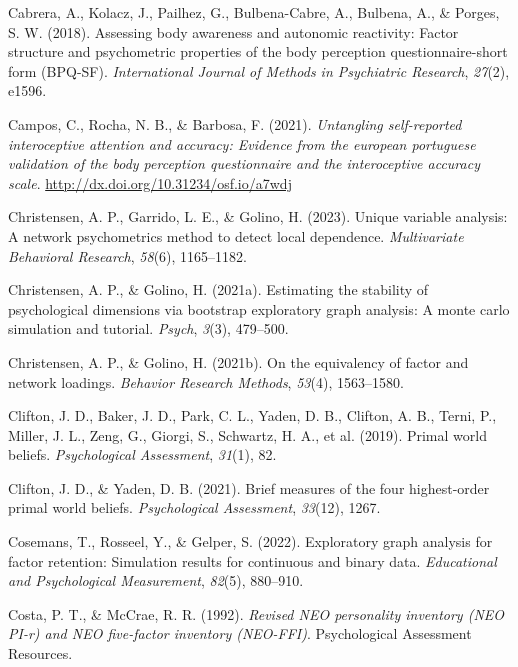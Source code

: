 \documentclass[
  jou,
  floatsintext,
  longtable,
  nolmodern,
  notxfonts,
  notimes,
  colorlinks=true,linkcolor=blue,citecolor=blue,urlcolor=blue]{apa7}
\newlength{\cslhangindent}
\newenvironment{CSLReferences}[2] %
 {\begin{list}{}{%
  \setlength{\itemindent}{0pt}
  \setlength{\leftmargin}{0pt}
  \setlength{\parsep}{0pt}
  \ifodd #1
   \setlength{\leftmargin}{\cslhangindent}
   \setlength{\itemindent}{-1\cslhangindent}
  \fi
  \setlength{\itemsep}{#2\baselineskip}}}
 {\end{list}}
\begin{document}
\begin{CSLReferences}{1}{0}
Cabrera, A., Kolacz, J., Pailhez, G., Bulbena-Cabre, A., Bulbena, A., \&
Porges, S. W. (2018). Assessing body awareness and autonomic reactivity:
Factor structure and psychometric properties of the body perception
questionnaire-short form (BPQ-SF). \emph{International Journal of
Methods in Psychiatric Research}, \emph{27}(2), e1596.

Campos, C., Rocha, N. B., \& Barbosa, F. (2021). \emph{Untangling
self-reported interoceptive attention and accuracy: Evidence from the
european portuguese validation of the body perception questionnaire and
the interoceptive accuracy scale}.
\url{http://dx.doi.org/10.31234/osf.io/a7wdj}

Christensen, A. P., Garrido, L. E., \& Golino, H. (2023). Unique
variable analysis: A network psychometrics method to detect local
dependence. \emph{Multivariate Behavioral Research}, \emph{58}(6),
1165--1182.

Christensen, A. P., \& Golino, H. (2021a). Estimating the stability of
psychological dimensions via bootstrap exploratory graph analysis: A
monte carlo simulation and tutorial. \emph{Psych}, \emph{3}(3),
479--500.

Christensen, A. P., \& Golino, H. (2021b). On the equivalency of factor
and network loadings. \emph{Behavior Research Methods}, \emph{53}(4),
1563--1580.

Clifton, J. D., Baker, J. D., Park, C. L., Yaden, D. B., Clifton, A. B.,
Terni, P., Miller, J. L., Zeng, G., Giorgi, S., Schwartz, H. A., et al.
(2019). Primal world beliefs. \emph{Psychological Assessment},
\emph{31}(1), 82.

Clifton, J. D., \& Yaden, D. B. (2021). Brief measures of the four
highest-order primal world beliefs. \emph{Psychological Assessment},
\emph{33}(12), 1267.

Cosemans, T., Rosseel, Y., \& Gelper, S. (2022). Exploratory graph
analysis for factor retention: Simulation results for continuous and
binary data. \emph{Educational and Psychological Measurement},
\emph{82}(5), 880--910.

Costa, P. T., \& McCrae, R. R. (1992). \emph{Revised NEO personality
inventory (NEO PI-r) and NEO five-factor inventory (NEO-FFI)}.
Psychological Assessment Resources.


\end{CSLReferences}
\end{document}
